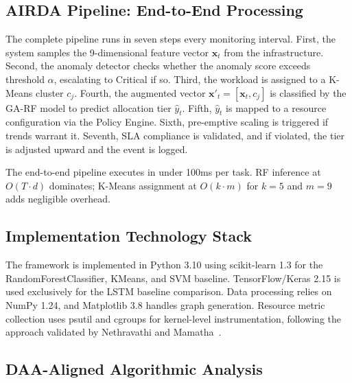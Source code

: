 \documentclass[conference]{IEEEtran}
\begin{document}
\subsection{AIRDA Pipeline: End-to-End Processing}
The complete pipeline runs in seven steps every monitoring interval. First, the system samples the 9-dimensional feature vector $\mathbf{x}_t$ from the infrastructure. Second, the anomaly detector checks whether the anomaly score exceeds threshold $\alpha$, escalating to Critical if so. Third, the workload is assigned to a K-Means cluster $c_j$. Fourth, the augmented vector $\mathbf{x}'_t = [\mathbf{x}_t, c_j]$ is classified by the GA-RF model to predict allocation tier $\hat{y}_t$. Fifth, $\hat{y}_t$ is mapped to a resource configuration via the Policy Engine. Sixth, pre-emptive scaling is triggered if trends warrant it. Seventh, SLA compliance is validated, and if violated, the tier is adjusted upward and the event is logged.

The end-to-end pipeline executes in under 100ms per task. RF inference at $O(T \cdot d)$ dominates; K-Means assignment at $O(k \cdot m)$ for $k=5$ and $m=9$ adds negligible overhead.

\subsection{Implementation Technology Stack}
The framework is implemented in Python 3.10 using scikit-learn 1.3 for the RandomForestClassifier, KMeans, and SVM baseline. TensorFlow/Keras 2.15 is used exclusively for the LSTM baseline comparison. Data processing relies on NumPy 1.24, and Matplotlib 3.8 handles graph generation. Resource metric collection uses psutil and cgroups for kernel-level instrumentation, following the approach validated by Nethravathi and Mamatha~\cite{Ref2}.

\subsection{DAA-Aligned Algorithmic Analysis}
\end{document}

